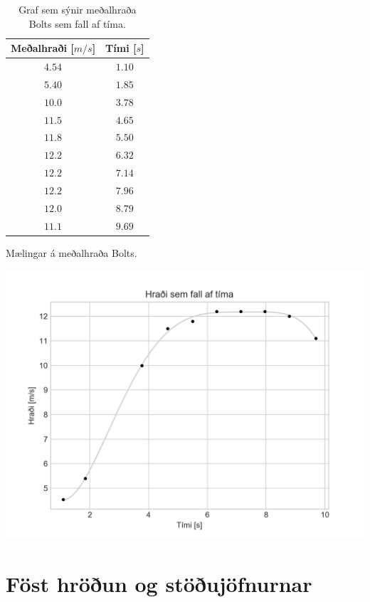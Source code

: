 \ifdefined \wholebook \else\documentclass[oneside]{book}\usepackage{EdlBook}\graphicspath{{figures/}}
\begin{document}
\begin{table}[H]
\begin{minipage}[c]{0.38\linewidth}
\centering
\begin{tabular}{|c|c|}
\hline
\textbf{Meðalhraði} [$\si{m/s}$] & \textbf{Tími} [$\si{s}$]\\
\hline
$4.54$ & $1.10$  \\
$5.40$ & $1.85$  \\
$10.0$ & $3.78$  \\
$11.5$ & $4.65$   \\
$11.8$ & $5.50$   \\
$12.2$ & $6.32$  \\
$12.2$ & $7.14$  \\
$12.2$ & $7.96$    \\
$12.0$ & $8.79$  \\
$11.1$ & $9.69$   \\
\hline
\end{tabular}
\label{tafla:usain2}
\caption{Mælingar á meðalhraða Bolts.}
\end{minipage}\hfill
\begin{minipage}[c]{0.6\linewidth}
\centering
\includegraphics[scale = 0.6]{images/plot_2.png}
\caption{Graf sem sýnir meðalhraða Bolts sem fall af tíma.}
\label{fig:bolt2}
\end{minipage}
\end{table}

\newpage

\section{Föst hröðun og stöðujöfnurnar}
\end{document}
